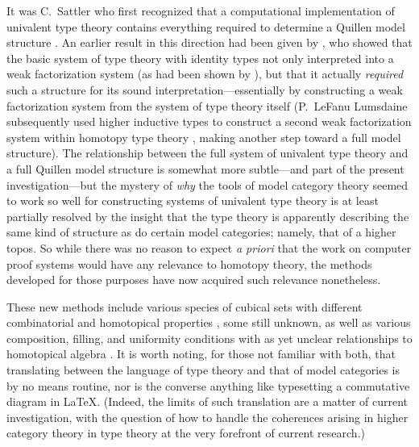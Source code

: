 \documentclass[11pt,reqno]{amsart}
\theoremstyle{remark}
\theoremstyle{definition}
\begin{document}
It was C.~Sattler who first recognized that a computational implementation of univalent type theory contains everything required to determine a Quillen model structure \cite{Sattler:2017ee}. An earlier result in this direction had been given by \cite{gambino-garner:idtypewfs}, who showed that the basic system of type theory with identity types not only interpreted into a weak factorization system (as had been shown by \cite{awodey-warren:homotopy-idtype}), but that it actually \emph{required} such a structure for its sound interpretation---essentially by constructing a weak factorization system from the system of type theory itself (P.~LeFanu Lumsdaine subsequently used higher inductive types to construct a second weak factorization system within homotopy type theory \cite{Lumsdaine:HITCofibrations}, making another step toward a full model structure).  The relationship between the full system of univalent type theory and a full Quillen model structure is somewhat more subtle---and part of the present investigation---but the mystery of \emph{why} the tools of model category theory seemed to work so well for constructing systems of univalent type theory is at least partially resolved by the insight that the type theory is apparently describing the same  kind of structure as do certain model categories; namely, that of a higher topos. 
So while there was no reason to expect \emph{a priori} that the work on computer proof systems 
would have any relevance to homotopy theory, the methods developed for those purposes have now acquired such relevance nonetheless. 

These new methods include various species of cubical sets with different combinatorial and homotopical properties \cite{BuchholtzMoorehouse}, some still unknown, as well as various composition, filling, and uniformity conditions with as yet unclear relationships to homotopical algebra \cite{orton-pitts,CCHM:2018ctt,BCH,ABCHFL,CMS:2020}. It is worth noting, for those not familiar with both, that translating between the language of type theory and that of model categories is by no means routine, nor is the converse anything like typesetting a commutative diagram in LaTeX.  (Indeed, the limits of such translation are a matter of current investigation, with the question of how to handle the coherences arising in higher category theory in type theory at the very forefront of current research.) 
\end{document}
